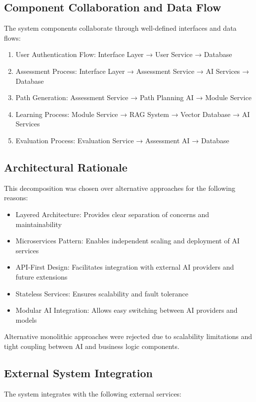 \documentclass{FastFyp}
\begin{document}
\subsection{Component Collaboration and Data Flow}
The system components collaborate through well-defined interfaces and data flows:

\begin{enumerate}
    \item User Authentication Flow: Interface Layer → User Service → Database
    \item Assessment Process: Interface Layer → Assessment Service → AI Services → Database
    \item Path Generation: Assessment Service → Path Planning AI → Module Service
    \item Learning Process: Module Service → RAG System → Vector Database → AI Services
    \item Evaluation Process: Evaluation Service → Assessment AI → Database
\end{enumerate}

\subsection{Architectural Rationale}
This decomposition was chosen over alternative approaches for the following reasons:

\begin{itemize}
    \item Layered Architecture: Provides clear separation of concerns and maintainability
    \item Microservices Pattern: Enables independent scaling and deployment of AI services
    \item API-First Design: Facilitates integration with external AI providers and future extensions
    \item Stateless Services: Ensures scalability and fault tolerance
    \item Modular AI Integration: Allows easy switching between AI providers and models
\end{itemize}

Alternative monolithic approaches were rejected due to scalability limitations and tight coupling between AI and business logic components.

\subsection{External System Integration}
The system integrates with the following external services:
\end{document}
